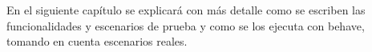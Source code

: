 En el siguiente capítulo se explicará con más detalle como se escriben las
funcionalidades y escenarios de prueba y como se los ejecuta con behave, tomando
en cuenta escenarios reales.

